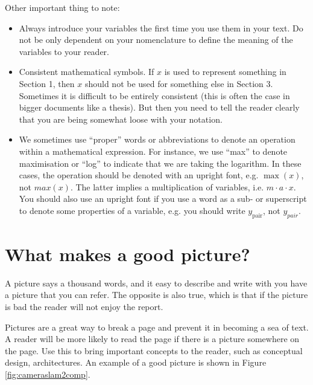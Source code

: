 \documentclass[12pt]{article}
\begin{document}
Other important thing to note:
\begin{itemize}
	\item Always introduce your variables the first time you use them in your text.
	Do not be only dependent on your nomenclature to define the meaning of the variables to your reader.
	
	\item Consistent mathematical symbols. If $x$ is used to represent something in Section 1, then $x$ should not be used for something else in Section 3.
	Sometimes it is difficult to be entirely consistent (this is often the case in bigger documents like a thesis).
	But then you need to tell the reader clearly that you are being somewhat loose with your notation.
	
	\item We sometimes use ``proper'' words or abbreviations to denote an operation within a mathematical expression.
	For instance, we use ``max'' to denote maximisation or ``log'' to indicate that we are taking the logarithm. In these cases, the operation should be denoted with an upright font, e.g. $\max(x)$, not $max(x)$.
	The latter implies a multiplication of variables, i.e. $m\cdot a\cdot x$. You should also use an upright font if you use a word as a sub- or superscript to denote some properties of a variable, e.g. you should write $y_{\text{pair}}$, not $y_{pair}$.
\end{itemize}

\section*{What makes a good picture?}
A picture says a thousand words, and it easy to describe and write with you have a picture that you can refer.
The opposite is also true, which is that if the picture is bad the reader will not enjoy the report.

Pictures are a great way to break a page and prevent it in becoming a sea of text.
A reader will be more likely to read the page if there is a picture somewhere on the page.
Use this to bring important concepts to the reader, such as conceptual design, architectures.
An example of a good picture is shown in Figure \ref{fig:cameraslam2comp}.
\end{document}
